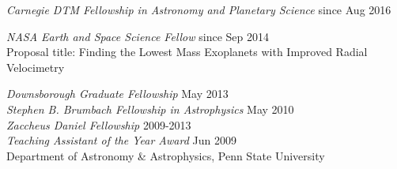 \begin{small}
{\sl Carnegie DTM Fellowship in Astronomy and Planetary Science} \hfill     since Aug 2016
\vspace{10pt}

{\sl NASA Earth and Space Science Fellow} \hfill     since Sep 2014 \\
Proposal title: Finding the Lowest Mass Exoplanets with Improved
Radial Velocimetry
\vspace{10pt}

{\sl Downsborough Graduate Fellowship} \hfill        May 2013 \\
{\sl Stephen B. Brumbach Fellowship in Astrophysics} \hfill        May 2010 \\
{\sl Zaccheus Daniel Fellowship} \hfill        2009-2013 \\
{\sl Teaching Assistant of the Year Award} \hfill        Jun 2009 \\
Department of Astronomy \& Astrophysics, Penn State University

\begin{comment}   
\newpage
\topic{\centerline{TELESCOPE TIME AWARDED AND OBSERVING EXPERIENCE}} 


{\bf Exoplanet Programs}

PI, 25.7 hours on Hobby-Eberly Telescope, with the High Resolution Spectrograph \hfill 2013 \\
{\it Improve the Radial Velocity Precision of HET/HRS}\\
Co-I: Jason Wright, Ming Zhao
\vspace{10pt}

Observer, Observing Planner, Tull Spectrograph at the McDonald Obs.\ 2.7m
Telescope \hfill 2013\\
TS12 arm, R$\sim$500,000, day-time runs
\vspace{10pt}

Observer, Keck/HIRES remote observing at Caltech and Yale ROCs \hfill 2010, 2011, 2013\\
\vspace{10pt}

{\bf Extragalactic Programs}

As founding member of the MUSSCEL program (MUltiwavelength Study of the
Structure, Chemistry and Evolution of LSB galaxies):
\vspace{10pt}

Co-I, 5 hours of Green Bank Telescope, 2015A with AUGUS receiver
\hfill 2014 \\
{\it CO in Low Surface Brightness Galaxies in Tandem with Optical/UV Star Formation}\\
PI: Jason Young, Co-Is: Rachel Kuzio de Naray, Karen O'Neil
\vspace{10pt}


\end{comment}
\end{small}
